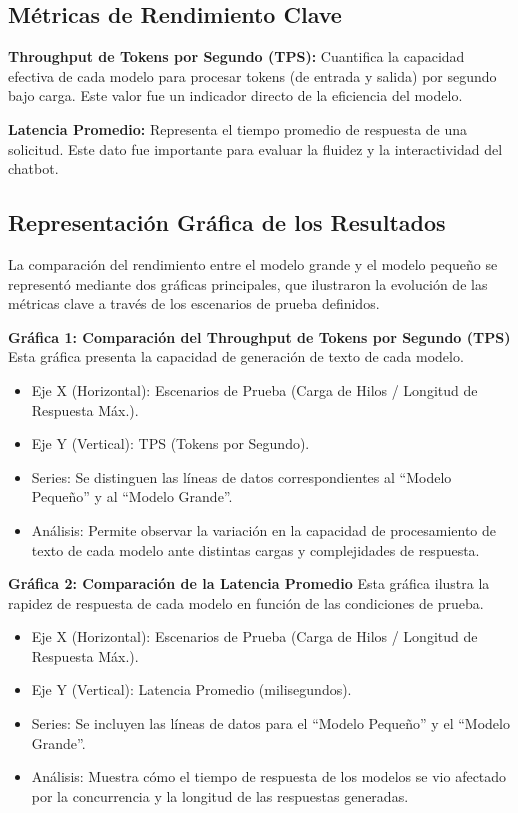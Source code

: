 \subsection*{Métricas de Rendimiento Clave}
\textbf{Throughput de Tokens por Segundo (TPS):} Cuantifica la capacidad efectiva de cada modelo para procesar tokens (de entrada y salida) por segundo bajo carga. Este valor fue un indicador directo de la eficiencia del modelo.

\textbf{Latencia Promedio:} Representa el tiempo promedio de respuesta de una solicitud. Este dato fue importante para evaluar la fluidez y la interactividad del chatbot.

\subsection*{Representación Gráfica de los Resultados}
La comparación del rendimiento entre el modelo grande y el modelo pequeño se representó mediante dos gráficas principales, que ilustraron la evolución de las métricas clave a través de los escenarios de prueba definidos.

\textbf{Gráfica 1: Comparación del Throughput de Tokens por Segundo (TPS)}
Esta gráfica presenta la capacidad de generación de texto de cada modelo.
\begin{itemize}
    \item Eje X (Horizontal): Escenarios de Prueba (Carga de Hilos / Longitud de Respuesta Máx.).
    \item Eje Y (Vertical): TPS (Tokens por Segundo).
    \item Series: Se distinguen las líneas de datos correspondientes al ``Modelo Pequeño'' y al ``Modelo Grande''.
    \item Análisis: Permite observar la variación en la capacidad de procesamiento de texto de cada modelo ante distintas cargas y complejidades de respuesta.
\end{itemize}

\textbf{Gráfica 2: Comparación de la Latencia Promedio}
Esta gráfica ilustra la rapidez de respuesta de cada modelo en función de las condiciones de prueba.
\begin{itemize}
    \item Eje X (Horizontal): Escenarios de Prueba (Carga de Hilos / Longitud de Respuesta Máx.).
    \item Eje Y (Vertical): Latencia Promedio (milisegundos).
    \item Series: Se incluyen las líneas de datos para el ``Modelo Pequeño'' y el ``Modelo Grande''.
    \item Análisis: Muestra cómo el tiempo de respuesta de los modelos se vio afectado por la concurrencia y la longitud de las respuestas generadas.
\end{itemize}

